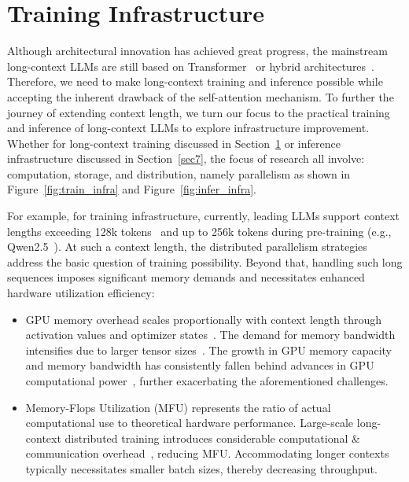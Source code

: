 \section{Training Infrastructure}\label{sec6}



Although architectural innovation has achieved great progress, the mainstream long-context LLMs are still based on Transformer~\citep{dubey2024llama,llama3_3,Deepseek2024DeepSeek-V3} or hybrid architectures~\citep{team2024jamba,minimax2025minimax01scalingfoundationmodels}. Therefore, we need to make long-context training and inference possible while accepting the inherent drawback of the self-attention mechanism. To further the journey of extending context length, we turn our focus to the practical training and inference of long-context LLMs to explore infrastructure improvement. Whether for long-context training discussed in Section~\ref{sec6} or inference infrastructure discussed in Section~\ref{sec7}, the focus of research all involve: computation, storage, and distribution, namely parallelism as shown in Figure~\ref{fig:train_infra} and Figure~\ref{fig:infer_infra}.

For example, for training infrastructure, 
currently, leading LLMs support context lengths exceeding 128k tokens~\citep{meta2024introducing, dubey2024llama, yang2024qwen2technicalreport} and up to 256k tokens during pre-training (e.g., Qwen2.5~\citep{qwen2024qwen25technicalreport}). At such a context length, the distributed parallelism strategies address the basic question of training possibility. Beyond that, handling such long sequences imposes significant memory demands and necessitates enhanced hardware utilization efficiency:

\begin{itemize}[leftmargin=2em]
\item GPU memory overhead scales proportionally with context length through activation values and optimizer states~\citep{guo2024survey, duan2024efficient}. The demand for memory bandwidth intensifies due to larger tensor sizes~\citep{semianalysis2023AICapacity, semianalysis2024trainium2}. The growth in GPU memory capacity and memory bandwidth has consistently fallen behind advances in GPU computational power~\citep{gholami2024ai, semianalysis2023AICapacity}, further exacerbating the aforementioned challenges.
\item Memory-Flops Utilization (MFU) represents the ratio of actual computational use to theoretical hardware performance. Large-scale long-context distributed training introduces considerable computational \& communication overhead~\citep{gu2024loongtrain, sun2024seq1f1befficientsequencelevelpipeline}, reducing  MFU. Accommodating longer contexts typically necessitates smaller batch sizes, thereby decreasing throughput.  
\end{itemize}

